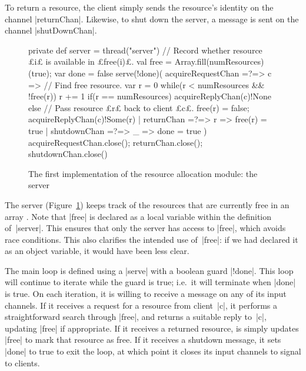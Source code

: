 To return a resource, the client simply sends the resource's identity on the
channel |returnChan|.  Likewise, to shut down the server, a message is sent on
the channel |shutDownChan|.


\begin{figure}
\begin{scala}
  private def server = thread("server"){
    // Record whether resource £i£ is available in £free(i)£.
    val free = Array.fill(numResources)(true); var done = false
    serve(!done)(
      acquireRequestChan =?=> { c => 
	// Find free resource.
	var r = 0
	while(r < numResources && !free(r)) r += 1
	if(r == numResources) acquireReplyChan(c)!None
        else{  // Pass resource £r£ back to client £c£.
	  free(r) = false; acquireReplyChan(c)!Some(r)
        }
      }
      | returnChan =?=> { r => free(r) = true }
      | shutdownChan =?=> { _ => done = true }
    )
    acquireRequestChan.close(); returnChan.close(); shutdownChan.close()
  }
\end{scala}
\caption{The first implementation of the resource allocation module: the
  server}
\label{fig:RAServer1-2}
\end{figure}


The server (Figure~\ref{fig:RAServer1-2}) keeps track of the resources that are
currently free in an array .  Note that |free| is declared as a
local variable within the definition of~|server|.  This ensures that only the
server has access to |free|, which avoids race conditions. This also clarifies
the intended use of~|free|: if we had declared it as an object variable, it
would have been less clear.

The main loop is defined using a |serve| with a boolean guard |!done|.  This
loop will continue to iterate while the guard is true; i.e.~it will terminate
when |done| is true.  On each iteration, it is willing to receive a message on
any of its input channels.  If it receives a request for a resource from
client~|c|, it performs a straightforward search through |free|, and returns a
suitable reply to~|c|, updating |free| if appropriate.  If it receives a
returned resource, is simply updates |free| to mark that resource as free.  If
it receives a shutdown message, it sets |done| to true to exit the loop, at
which point it closes its input channels to signal to clients.

